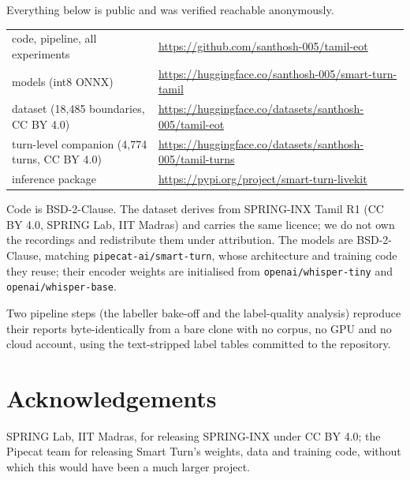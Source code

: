 \documentclass[11pt]{article}
\begin{document}
Everything below is public and was verified reachable anonymously.

\begin{center}\small
\begin{tabular}{ll}
\toprule
code, pipeline, all experiments & \url{https://github.com/santhosh-005/tamil-eot} \\
models (int8 ONNX) & \url{https://huggingface.co/santhosh-005/smart-turn-tamil} \\
dataset (18,485 boundaries, CC BY 4.0) & \url{https://huggingface.co/datasets/santhosh-005/tamil-eot} \\
turn-level companion (4,774 turns, CC BY 4.0) & \url{https://huggingface.co/datasets/santhosh-005/tamil-turns} \\
inference package & \url{https://pypi.org/project/smart-turn-livekit} \\
\bottomrule
\end{tabular}
\end{center}

Code is BSD-2-Clause. The dataset derives from SPRING-INX Tamil R1
\cite{springinx} (CC BY 4.0, SPRING Lab, IIT Madras) and carries the same
licence; we do not own the recordings and redistribute them under attribution.
The models are BSD-2-Clause, matching \texttt{pipecat-ai/smart-turn}, whose
architecture and training code they reuse; their encoder weights are initialised
from \texttt{openai/whisper-tiny} and \texttt{openai/whisper-base}.

Two pipeline steps (the labeller bake-off and the label-quality analysis)
reproduce their reports byte-identically from a bare clone with no corpus, no
GPU and no cloud account, using the text-stripped label tables committed to the
repository.

\section*{Acknowledgements}

SPRING Lab, IIT Madras, for releasing SPRING-INX under CC BY 4.0; the Pipecat
team for releasing Smart Turn's weights, data and training code, without which
this would have been a much larger project.
\end{document}
